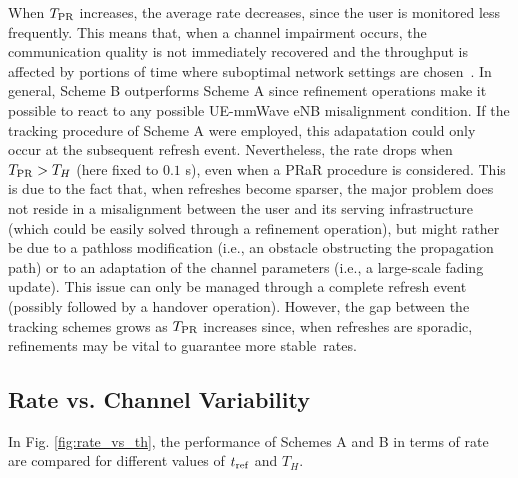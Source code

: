 \documentclass[conference]{IEEEtran}
\begin{document}
When $T_{\rm PR}$ increases, the average rate decreases, since the user is
monitored less frequently. 
This means that, when a channel impairment occurs, the communication quality is not immediately
recovered and the throughput is affected by portions of time where suboptimal network settings
are chosen~\cite{giordani2016uplink}.
In general, Scheme B outperforms Scheme A since refinement operations make it possible to react to any possible UE-mmWave eNB misalignment condition. If the tracking procedure of Scheme A were employed, this adapatation could only occur at the subsequent refresh event.
Nevertheless, the rate drops when $T_{\rm PR}>T_{H}$ (here fixed to $0.1$ s), even when a PRaR procedure is considered. 
This is due to the fact that, when refreshes become sparser, the major problem does not reside in a misalignment between the user and its serving infrastructure (which could be easily solved through a refinement operation), but might rather be due to a pathloss modification (i.e., an obstacle obstructing the propagation path) or to an adaptation of the channel parameters (i.e., a large-scale fading update). This issue can only be managed through a complete refresh event (possibly followed by a handover operation).
However, the gap between the tracking schemes grows as $T_{\rm PR}$ increases since, when refreshes are sporadic, refinements may be vital to guarantee more stable~rates.




\subsection{Rate vs. Channel Variability}
\label{sec:rate_vs_H}




In Fig. \ref{fig:rate_vs_th}, the performance of Schemes A  and B in terms of rate are compared for different values of $t_{\rm ref}$ and $T_H$.
\end{document}
